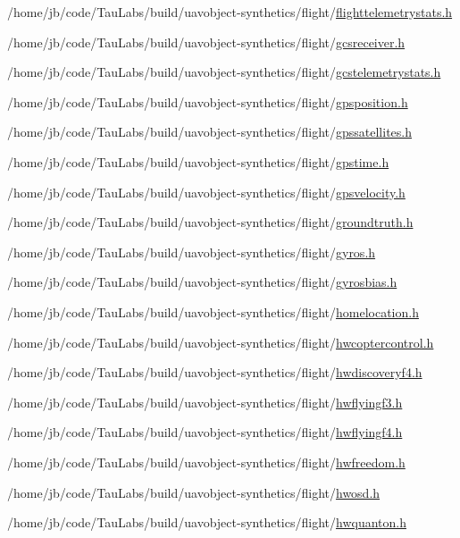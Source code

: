 \begin{DoxyCompactItemize}
/home/jb/code/\-Tau\-Labs/build/uavobject-\/synthetics/flight/\hyperlink{flighttelemetrystats_8h}{flighttelemetrystats.\-h}\item 
/home/jb/code/\-Tau\-Labs/build/uavobject-\/synthetics/flight/\hyperlink{gcsreceiver_8h}{gcsreceiver.\-h}\item 
/home/jb/code/\-Tau\-Labs/build/uavobject-\/synthetics/flight/\hyperlink{gcstelemetrystats_8h}{gcstelemetrystats.\-h}\item 
/home/jb/code/\-Tau\-Labs/build/uavobject-\/synthetics/flight/\hyperlink{gpsposition_8h}{gpsposition.\-h}\item 
/home/jb/code/\-Tau\-Labs/build/uavobject-\/synthetics/flight/\hyperlink{gpssatellites_8h}{gpssatellites.\-h}\item 
/home/jb/code/\-Tau\-Labs/build/uavobject-\/synthetics/flight/\hyperlink{gpstime_8h}{gpstime.\-h}\item 
/home/jb/code/\-Tau\-Labs/build/uavobject-\/synthetics/flight/\hyperlink{gpsvelocity_8h}{gpsvelocity.\-h}\item 
/home/jb/code/\-Tau\-Labs/build/uavobject-\/synthetics/flight/\hyperlink{groundtruth_8h}{groundtruth.\-h}\item 
/home/jb/code/\-Tau\-Labs/build/uavobject-\/synthetics/flight/\hyperlink{gyros_8h}{gyros.\-h}\item 
/home/jb/code/\-Tau\-Labs/build/uavobject-\/synthetics/flight/\hyperlink{gyrosbias_8h}{gyrosbias.\-h}\item 
/home/jb/code/\-Tau\-Labs/build/uavobject-\/synthetics/flight/\hyperlink{homelocation_8h}{homelocation.\-h}\item 
/home/jb/code/\-Tau\-Labs/build/uavobject-\/synthetics/flight/\hyperlink{hwcoptercontrol_8h}{hwcoptercontrol.\-h}\item 
/home/jb/code/\-Tau\-Labs/build/uavobject-\/synthetics/flight/\hyperlink{hwdiscoveryf4_8h}{hwdiscoveryf4.\-h}\item 
/home/jb/code/\-Tau\-Labs/build/uavobject-\/synthetics/flight/\hyperlink{hwflyingf3_8h}{hwflyingf3.\-h}\item 
/home/jb/code/\-Tau\-Labs/build/uavobject-\/synthetics/flight/\hyperlink{hwflyingf4_8h}{hwflyingf4.\-h}\item 
/home/jb/code/\-Tau\-Labs/build/uavobject-\/synthetics/flight/\hyperlink{hwfreedom_8h}{hwfreedom.\-h}\item 
/home/jb/code/\-Tau\-Labs/build/uavobject-\/synthetics/flight/\hyperlink{hwosd_8h}{hwosd.\-h}\item 
/home/jb/code/\-Tau\-Labs/build/uavobject-\/synthetics/flight/\hyperlink{hwquanton_8h}{hwquanton.\-h}\item 

\end{DoxyCompactItemize}
